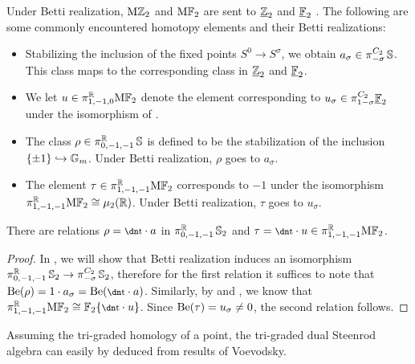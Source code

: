 \begin{rec} \label{rec:elements}
  Under Betti realization, $\mathrm{M}\mathbb{Z}_{2}$ and $\mathrm{M}\mathbb{F}_2$ are sent to $\underline{\mathbb{Z}}_{2}$ and $\underline{\mathbb{F}}_2$ \cite{HellerOrmsby}.
  The following are some commonly encountered homotopy elements and their Betti realizations:
  \begin{itemize}
  \item Stabilizing the inclusion of the fixed points $S^0 \to S^{\sigma}$, we obtain $a_\sigma \in \pi_{-\sigma} ^{C_2} \operatorname{\mathbb{S}}$. This class maps to the corresponding class in $\underline{\mathbb{Z}}_{2}$ and $\underline{\mathbb{F}}_2$. %
  \item We let $u \in \pi_{1,-1,0} ^{\mathbb{R}} \mathrm{M}\mathbb{F}_2$ denote the element corresponding to $u_\sigma \in \pi_{1-\sigma} ^{C_2} \underline{\mathbb{F}}_2$ under the isomorphism of .
  \item The class $\rho \in \pi_{0,-1,-1} ^{\mathbb{R}} \operatorname{\mathbb{S}}$ is defined to be the stabilization of the inclusion $\{\pm 1\} \hookrightarrow \mathbb{G}_m$. Under Betti realization, $\rho$ goes to $a_\sigma$.
  \item The element $\tau \in \pi_{1,-1,-1}^{\mathbb{R}} \mathrm{M}\mathbb{F}_2$ corresponds to $-1$ under the %
    isomorphism $\pi_{1,-1,-1} ^{\mathbb{R}} \mathrm{M}\mathbb{F}_2 \cong \mu_2 (\mathbb{R})$.  Under Betti realization, $\tau$ goes to $u_\sigma$.
  \end{itemize}
\end{rec}

\begin{cor}\label{cor:rels}
  There are relations $\rho = \ta \cdot a$ in $\pi_{0,-1,-1} ^{\mathbb{R}} \operatorname{\mathbb{S}}_2$ and $\tau = \ta \cdot u \in \pi_{1,-1,-1} ^{\R} \HFt$.
\end{cor}

\begin{proof}
  In , we will show that Betti realization induces an isomorphism
  $\pi_{0,-1,-1} ^{\mathbb{R}} \operatorname{\mathbb{S}}_2 \to \pi_{-\sigma}^{C_2} \operatorname{\mathbb{S}}_2$,
  therefore for the first relation it suffices to note that $\b (\rho) = 1 \cdot a_\sigma = \b ( \ta \cdot a)$. Similarly, by  and , we know that $\pi_{1,-1,-1} ^\R \HFt \cong \F_2 \{\ta \cdot u\}$. Since $\mathrm{Be} (\tau) = u_\sigma \neq 0$, the second relation follows.
\end{proof}

Assuming the tri-graded homology of a point, the tri-graded dual Steenrod algebra can easily by deduced from results of Voevodsky.

